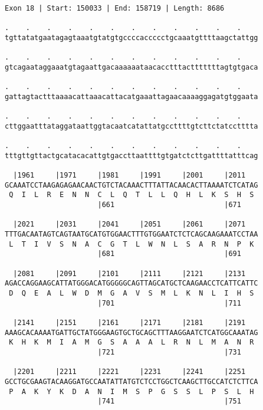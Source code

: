\documentclass{article}
\begin{document}
\newpage
\begin{Verbatim}[fontfamily=courier]
Exon 18 | Start: 150033 | End: 158719 | Length: 8686

.    .    .    .    .    .    .    .    .    .    .    .    
tgttatatgaatagagtaaatgtatgtgccccaccccctgcaaatgttttaagctattgg

.    .    .    .    .    .    .    .    .    .    .    .    
gtcagaataggaaatgtagaattgacaaaaaataacacctttactttttttagtgtgaca

.    .    .    .    .    .    .    .    .    .    .    .    
gattagtactttaaaacattaaacattacatgaaattagaacaaaaggagatgtggaata

.    .    .    .    .    .    .    .    .    .    .    .    
cttggaatttataggataattggtacaatcatattatgccttttgtcttctatcctttta

.    .    .    .    .    .    .    .    .    .    .    .    
tttgttgttactgcatacacattgtgaccttaattttgtgatctcttgattttatttcag

  |1961     |1971     |1981     |1991     |2001     |2011   
GCAAATCCTAAGAGAGAACAACTGTCTACAAACTTTATTACAACACTTAAAATCTCATAG
 Q  I  L  R  E  N  N  C  L  Q  T  L  L  Q  H  L  K  S  H  S 
                      |661                          |671    

  |2021     |2031     |2041     |2051     |2061     |2071   
TTTGACAATAGTCAGTAATGCATGTGGAACTTTGTGGAATCTCTCAGCAAGAAATCCTAA
 L  T  I  V  S  N  A  C  G  T  L  W  N  L  S  A  R  N  P  K 
                      |681                          |691    

  |2081     |2091     |2101     |2111     |2121     |2131   
AGACCAGGAAGCATTATGGGACATGGGGGCAGTTAGCATGCTCAAGAACCTCATTCATTC
 D  Q  E  A  L  W  D  M  G  A  V  S  M  L  K  N  L  I  H  S 
                      |701                          |711    

  |2141     |2151     |2161     |2171     |2181     |2191   
AAAGCACAAAATGATTGCTATGGGAAGTGCTGCAGCTTTAAGGAATCTCATGGCAAATAG
 K  H  K  M  I  A  M  G  S  A  A  A  L  R  N  L  M  A  N  R 
                      |721                          |731    

  |2201     |2211     |2221     |2231     |2241     |2251   
GCCTGCGAAGTACAAGGATGCCAATATTATGTCTCCTGGCTCAAGCTTGCCATCTCTTCA
 P  A  K  Y  K  D  A  N  I  M  S  P  G  S  S  L  P  S  L  H 
                      |741                          |751    

\end{Verbatim}
\newpage
\end{document}
